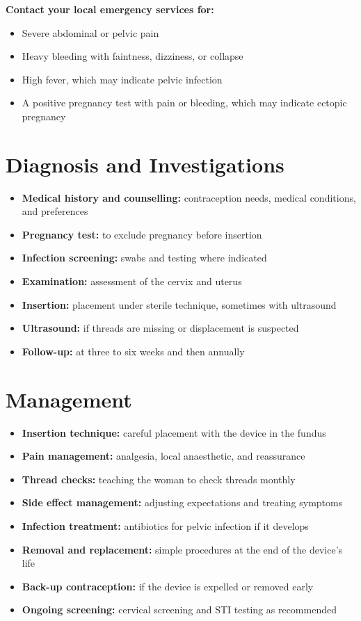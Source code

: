 \textbf{Contact your local emergency services for:}
\begin{itemize}
    \item Severe abdominal or pelvic pain
    \item Heavy bleeding with faintness, dizziness, or collapse
    \item High fever, which may indicate pelvic infection
    \item A positive pregnancy test with pain or bleeding, which may indicate ectopic pregnancy
\end{itemize}

\section*{Diagnosis and Investigations}
\begin{itemize}
    \item \textbf{Medical history and counselling:} contraception needs, medical conditions, and preferences
    \item \textbf{Pregnancy test:} to exclude pregnancy before insertion
    \item \textbf{Infection screening:} swabs and testing where indicated
    \item \textbf{Examination:} assessment of the cervix and uterus
    \item \textbf{Insertion:} placement under sterile technique, sometimes with ultrasound
    \item \textbf{Ultrasound:} if threads are missing or displacement is suspected
    \item \textbf{Follow-up:} at three to six weeks and then annually
\end{itemize}

\section*{Management}
\begin{itemize}
    \item \textbf{Insertion technique:} careful placement with the device in the fundus
    \item \textbf{Pain management:} analgesia, local anaesthetic, and reassurance
    \item \textbf{Thread checks:} teaching the woman to check threads monthly
    \item \textbf{Side effect management:} adjusting expectations and treating symptoms
    \item \textbf{Infection treatment:} antibiotics for pelvic infection if it develops
    \item \textbf{Removal and replacement:} simple procedures at the end of the device's life
    \item \textbf{Back-up contraception:} if the device is expelled or removed early
    \item \textbf{Ongoing screening:} cervical screening and STI testing as recommended
\end{itemize}


